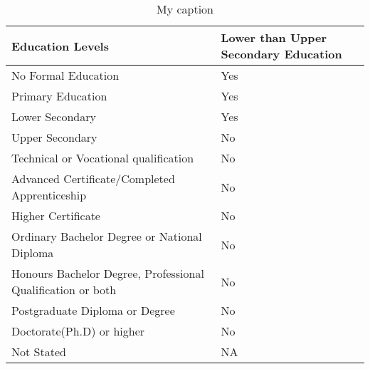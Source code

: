 \begin{table}[H]
	\centering
	\resizebox{\textwidth}{!}
	{
	\label{my-label}
	\begin{tabular}{|l |l|}
		\hline
		\textbf{Education Levels}                                   & \textbf{Lower than Upper Secondary Education} \\ \hline
		No Formal Education                                         & Yes                                           \\ \hline
		Primary Education                                           & Yes                                           \\ \hline
		Lower Secondary                                             & Yes                                           \\ \hline
		Upper Secondary                                             & No                                            \\ \hline
		Technical or Vocational qualification                       & No                                            \\ \hline
		Advanced Certificate/Completed Apprenticeship               & No                                            \\ \hline
		Higher Certificate                                          & No                                            \\ \hline
		Ordinary Bachelor Degree or National Diploma                & No                                            \\ \hline
		Honours Bachelor Degree, Professional Qualification or both & No                                            \\ \hline
		Postgraduate Diploma or Degree                              & No                                            \\ \hline
		Doctorate(Ph.D) or higher                                   & No                                            \\ \hline
		Not Stated                                                  & NA                                            \\ \hline
	\end{tabular}
	}
	\caption{My caption}
\end{table}

